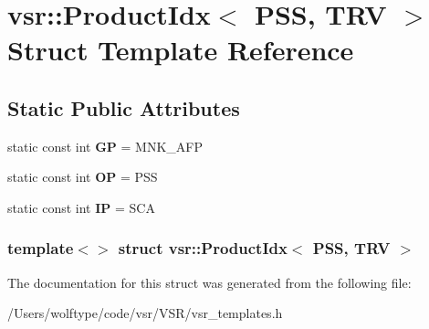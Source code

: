 \hypertarget{structvsr_1_1_product_idx_3_01_p_s_s_00_01_t_r_v_01_4}{\section{vsr\-:\-:Product\-Idx$<$ P\-S\-S, T\-R\-V $>$ Struct Template Reference}
\label{structvsr_1_1_product_idx_3_01_p_s_s_00_01_t_r_v_01_4}
}
\subsection*{Static Public Attributes}
\begin{DoxyCompactItemize}
\item 
\hypertarget{structvsr_1_1_product_idx_3_01_p_s_s_00_01_t_r_v_01_4_a237325141aadca68964b3a07482e8e30}{static const int {\bfseries G\-P} = M\-N\-K\-\_\-\-A\-F\-P}\label{structvsr_1_1_product_idx_3_01_p_s_s_00_01_t_r_v_01_4_a237325141aadca68964b3a07482e8e30}

\item 
\hypertarget{structvsr_1_1_product_idx_3_01_p_s_s_00_01_t_r_v_01_4_aff677970d21af8f2b799333be50da30e}{static const int {\bfseries O\-P} = P\-S\-S}\label{structvsr_1_1_product_idx_3_01_p_s_s_00_01_t_r_v_01_4_aff677970d21af8f2b799333be50da30e}

\item 
\hypertarget{structvsr_1_1_product_idx_3_01_p_s_s_00_01_t_r_v_01_4_a2150409e0b048ca6205b42c2c1b2284a}{static const int {\bfseries I\-P} = S\-C\-A}\label{structvsr_1_1_product_idx_3_01_p_s_s_00_01_t_r_v_01_4_a2150409e0b048ca6205b42c2c1b2284a}

\end{DoxyCompactItemize}
\subsubsection*{template$<$$>$ struct vsr\-::\-Product\-Idx$<$ P\-S\-S, T\-R\-V $>$}



The documentation for this struct was generated from the following file\-:\begin{DoxyCompactItemize}
\item 
/\-Users/wolftype/code/vsr/\-V\-S\-R/vsr\-\_\-templates.\-h\end{DoxyCompactItemize}
